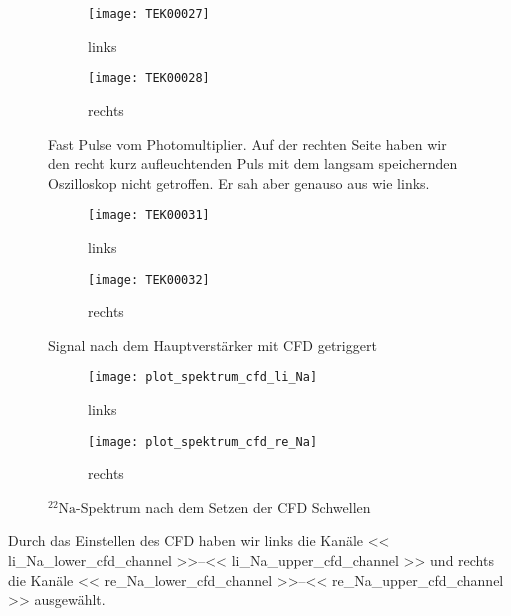 \documentclass[11pt, ngerman, fleqn, DIV=15, headinclude, BCOR=2cm]{scrreprt}
\begin{document}

\begin{figure}
	\centering
	\begin{subfigure}{0.49 \textwidth}
		\texttt{[image: TEK00027]}
		\caption{%
			links
		}
		\label{fig:fast_signal-li}
	\end{subfigure}
	\begin{subfigure}{0.49 \textwidth}
		\texttt{[image: TEK00028]}
		\caption{%
			rechts
		}
		\label{fig:fast_signal-re}
	\end{subfigure}
	\caption{%
		Fast Pulse vom Photomultiplier. Auf der rechten Seite haben wir
		den recht kurz aufleuchtenden Puls mit dem langsam speichernden
		Oszilloskop nicht getroffen. Er sah aber genauso aus wie links.
	}
	\label{fig:fast_signal}
\end{figure}

\begin{figure}
	\centering
	\begin{subfigure}{0.49 \textwidth}
		\texttt{[image: TEK00031]}
		\caption{%
			links
		}
		\label{fig:fast_signal_cfd_trig-li}
	\end{subfigure}
	\begin{subfigure}{0.49 \textwidth}
		\texttt{[image: TEK00032]}
		\caption{%
			rechts
		}
		\label{fig:fast_signal_cfd_trig-re}
	\end{subfigure}
	\caption{%
		Signal nach dem Hauptverstärker mit CFD getriggert
	}
	\label{fig:fast_signal_cfd_trig}
\end{figure}

\begin{figure}
	\centering
	\begin{subfigure}{0.49 \textwidth}
		\texttt{[image: plot\_spektrum\_cfd\_li\_Na]}
		\caption{%
			links
		}
		\label{fig:fast_signal_cfd_plot-li}
	\end{subfigure}
	\begin{subfigure}{0.49 \textwidth}
		\texttt{[image: plot\_spektrum\_cfd\_re\_Na]}
		\caption{%
			rechts
		}
		\label{fig:fast_signal_cfd_plot-re}
	\end{subfigure}
	\caption{%
		$^{22}\text{Na}$-Spektrum nach dem Setzen der CFD Schwellen
	}
	\label{fig:fast_signal_cfd_plot}
\end{figure}

Durch das Einstellen des CFD haben wir links die Kanäle
\numrange{<< li_Na_lower_cfd_channel >>}{<< li_Na_upper_cfd_channel >>} und rechts
die Kanäle
\numrange{<< re_Na_lower_cfd_channel >>}{<< re_Na_upper_cfd_channel >>} ausgewählt.
\end{document}
